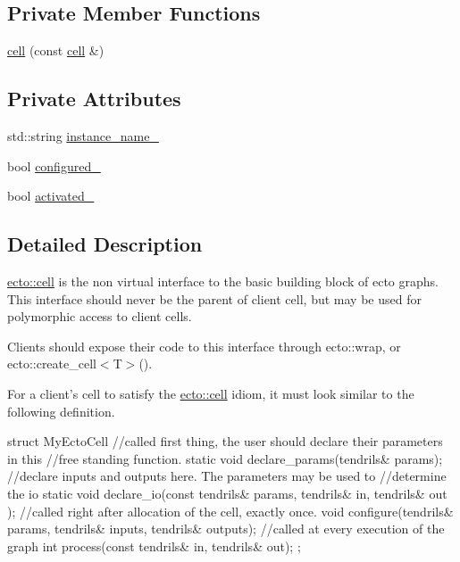 \subsection*{\-Private \-Member \-Functions}
\begin{DoxyCompactItemize}
\item 
\hyperlink{structecto_1_1cell_ac0ae6a72cecf48916bb6dd1b6393d1b3}{cell} (const \hyperlink{structecto_1_1cell}{cell} \&)
\end{DoxyCompactItemize}
\subsection*{\-Private \-Attributes}
\begin{DoxyCompactItemize}
\item 
std\-::string \hyperlink{structecto_1_1cell_a2bf4e65c7a699624c61d3b55cfac45ed}{instance\-\_\-name\-\_\-}
\item 
bool \hyperlink{structecto_1_1cell_a187d36610ae8035e9f589de06ecc0d0a}{configured\-\_\-}
\item 
bool \hyperlink{structecto_1_1cell_ad270620c006f30471b2371feb38b6a03}{activated\-\_\-}
\end{DoxyCompactItemize}


\subsection{\-Detailed \-Description}
\hyperlink{structecto_1_1cell}{ecto\-::cell} is the non virtual interface to the basic building block of ecto graphs. \-This interface should never be the parent of client cell, but may be used for polymorphic access to client cells. 

\-Clients should expose their code to this interface through ecto\-::wrap, or ecto\-::create\-\_\-cell$<$\-T$>$().

\-For a client's cell to satisfy the \hyperlink{structecto_1_1cell}{ecto\-::cell} idiom, it must look similar to the following definition. 
\begin{DoxyCode}
   struct MyEctoCell
   {
     //called first thing, the user should declare their parameters in this
     //free standing function.
     static void declare_params(tendrils& params);
     //declare inputs and outputs here. The parameters may be used to
     //determine the io
     static void declare_io(const tendrils& params, tendrils& in, tendrils& out
      );
     //called right after allocation of the cell, exactly once.
     void configure(tendrils& params, tendrils& inputs, tendrils& outputs);
     //called at every execution of the graph
     int process(const tendrils& in, tendrils& out);
   };
\end{DoxyCode}


